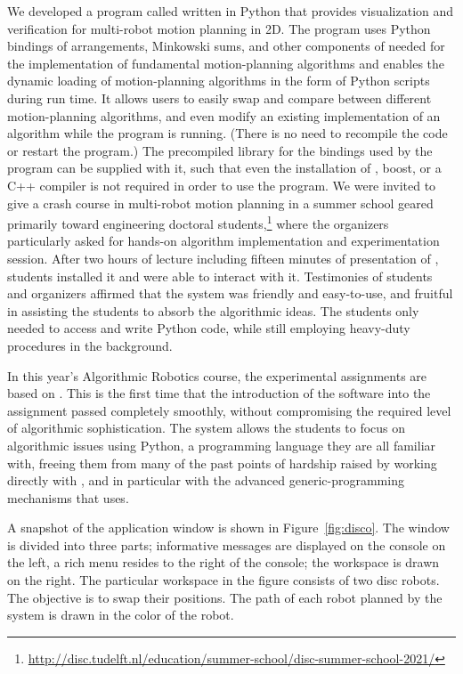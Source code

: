 We developed a program called \disco{} written in Python that provides visualization and verification for multi-robot motion planning in 2D.  The program uses Python bindings of \cgal{} arrangements, \cgal{} Minkowski sums, and other components of \cgal{} needed for the implementation of fundamental motion-planning algorithms and enables the dynamic loading of motion-planning algorithms in the form of Python scripts during run time. It allows users to easily swap and compare between different motion-planning algorithms, and even modify an existing implementation of an algorithm while the program is running. (There is no need to recompile the code or restart the program.) The precompiled library for the \cgal{} bindings used by the program can be supplied with it, such that even the installation of \cgal{}, boost, or a C++ compiler is not required in order to use the program. We were invited to give a crash course in multi-robot motion planning in a summer school geared primarily toward engineering doctoral students,\footnote{\url{http://disc.tudelft.nl/education/summer-school/disc-summer-school-2021/}} where the organizers particularly asked for hands-on algorithm implementation and experimentation session. After two hours of lecture including fifteen minutes of presentation of \disco, students installed it and were able to interact with it. Testimonies of students and organizers affirmed that the system was friendly and easy-to-use, and fruitful in assisting the students to absorb the algorithmic ideas. The students only needed to access and write Python code, while still employing heavy-duty \cgal{} procedures in the background.

In this year's Algorithmic Robotics course, the experimental assignments are based on \disco{}. This is the first time that the introduction of the software into the assignment passed completely smoothly, without compromising the required level of algorithmic sophistication. The system allows the students to focus on algorithmic issues using Python, a programming language they are all familiar with, freeing them from many of the past points of hardship raised by working directly with \cgal{}, and in particular with the advanced generic-programming mechanisms that \cgal{} uses.

A snapshot of the \disco{} application window is shown in Figure~\ref{fig:disco}. The window is divided into three parts; informative messages are displayed on the console on the left, a rich menu resides to the right of the console; the workspace is drawn on the right. The particular workspace in the figure consists of two disc robots. The objective is to swap their positions. The path of each robot planned by the system is drawn in the color of the robot.

